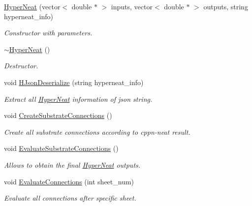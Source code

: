 \begin{DoxyCompactItemize}
\item 
\hyperlink{class_a_n_n___u_s_m_1_1_hyper_neat_afa5ee92982d0a780e485341722a00286}{Hyper\-Neat} (vector$<$ double $\ast$ $>$ inputs, vector$<$ double $\ast$ $>$ outputs, string hyperneat\-\_\-info)
\begin{DoxyCompactList}\small\item\em Constructor with parameters. \end{DoxyCompactList}\item 
\hyperlink{class_a_n_n___u_s_m_1_1_hyper_neat_a1cd44e92cbfd6902977aad68ab7585ed}{$\sim$\-Hyper\-Neat} ()
\begin{DoxyCompactList}\small\item\em Destructor. \end{DoxyCompactList}\item 
void \hyperlink{class_a_n_n___u_s_m_1_1_hyper_neat_a67803bb6c5dc5986d9c44877d92587af}{H\-Json\-Deserialize} (string hyperneat\-\_\-info)
\begin{DoxyCompactList}\small\item\em Extract all \hyperlink{class_a_n_n___u_s_m_1_1_hyper_neat}{Hyper\-Neat} information of json string. \end{DoxyCompactList}\item 
void \hyperlink{class_a_n_n___u_s_m_1_1_hyper_neat_a0eb24949bc741c24f12bd812d519de8c}{Create\-Substrate\-Connections} ()
\begin{DoxyCompactList}\small\item\em Create all substrate connections according to cppn-\/neat result. \end{DoxyCompactList}\item 
void \hyperlink{class_a_n_n___u_s_m_1_1_hyper_neat_a593bcca0140041a340814b91d29a4a13}{Evaluate\-Substrate\-Connections} ()
\begin{DoxyCompactList}\small\item\em Allows to obtain the final \hyperlink{class_a_n_n___u_s_m_1_1_hyper_neat}{Hyper\-Neat} outputs. \end{DoxyCompactList}\item 
void \hyperlink{class_a_n_n___u_s_m_1_1_hyper_neat_aa2db8cfc0f567d330c07fbc209ad1bf2}{Evaluate\-Connections} (int sheet\-\_\-num)
\begin{DoxyCompactList}\small\item\em Evaluate all connections after specific sheet. \end{DoxyCompactList}\end{DoxyCompactItemize}


